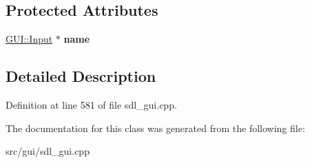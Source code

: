 \subsection*{Protected Attributes}
\begin{DoxyCompactItemize}
\item 
\hypertarget{classSaveLangDialog_aac396e13fdd8c3784b2c85e1d23adcd3}{\hyperlink{classGUI_1_1Input}{G\-U\-I\-::\-Input} $\ast$ {\bfseries name}}\label{classSaveLangDialog_aac396e13fdd8c3784b2c85e1d23adcd3}

\end{DoxyCompactItemize}


\subsection{Detailed Description}


Definition at line 581 of file sdl\-\_\-gui.\-cpp.



The documentation for this class was generated from the following file\-:\begin{DoxyCompactItemize}
\item 
src/gui/sdl\-\_\-gui.\-cpp\end{DoxyCompactItemize}
